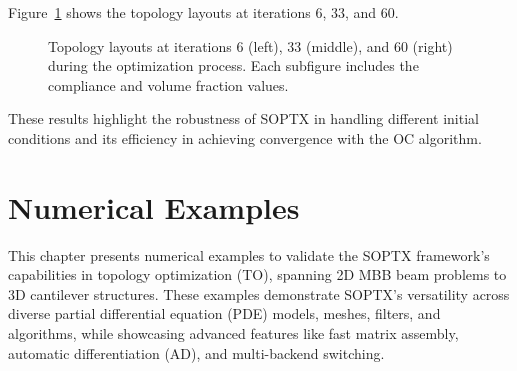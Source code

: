 \documentclass[mathpazo]{cicp}
\begin{document}
Figure~\ref{fig:canti_1_all} shows the topology layouts at iterations 6, 33, and 60.
\begin{figure}[htb]
	\centering
	\caption{Topology layouts at iterations 6 (left), 33 (middle), and 60 (right) during the optimization process. Each subfigure includes the compliance and volume fraction values.}
	\label{fig:canti_1_all}
\end{figure}

These results highlight the robustness of SOPTX in handling different initial conditions and its efficiency in achieving convergence with the OC algorithm.

\section{Numerical Examples}
This chapter presents numerical examples to validate the SOPTX framework's capabilities in topology optimization (TO), spanning 2D MBB beam problems to 3D cantilever structures. These examples demonstrate SOPTX's versatility across diverse partial differential equation (PDE) models, meshes, filters, and algorithms, while showcasing advanced features like fast matrix assembly, automatic differentiation (AD), and multi-backend switching.
\end{document}
